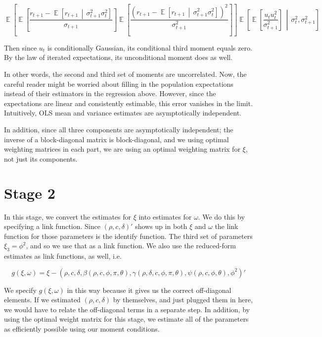 \documentclass[11pt, letterpaper, twoside, final]{article}
\newcommand*{\mvert}{\,\middle\vert\,}
\DeclareMathOperator*{\E}{\mathbb{E}}
\begin{document}
\begin{equation}
    \E\left[\E\left[\frac{r_{t+1} - \E\left[r_{t+1}\mvert \sigma^2_{t+1} \sigma^2_t\right]}{\sigma_{t+1}} \right]
    \E\left[\frac{(r_{t+1} - \E\left[r_{t+1} \mvert \sigma^2_{t+1} \sigma^2_t\right])^2}{\sigma^2_{t+1}}\right]
    \right] 
%
    \E\left[\E\left[\frac{u_t u_t^2}{\sigma^2_{t+1}}\right] \mvert \sigma^2_t, \sigma^2_{t+1} \right] 
\end{equation}

Then since $u_t$ is conditionally Gaussian, its conditional third moment equals zero.  
By the law of iterated expectations, its unconditional moment does as well.

In other words, the second and third set of moments are uncorrelated.
Now, the careful reader might be worried about filling in the population expectations instead of their estimators
in the regression above.
However, since the expectations are linear and consistently estimable, this error vanishes in the limit. 
Intuitively, OLS mean and variance estimates are asymptotically independent.

In addition, since all three components are asymptotically independent; the inverse of a block-diagonal matrix is
block-diagonal, and we using optimal weighting matrices in each part, we are using an
optimal weighting matrix for $\xi$, not just its components.


\section{Stage 2}

In this stage, we convert the estimates for $\xi$ into estimates for $\omega$. 
We do this by specifying a link function.
Since $(\rho, c, \delta)'$ shows up in both $\xi$ and $\omega$ the link function for those parameters is the
identify function.
The third set of parameters $\xi_3 = \phi^2$, and so we use that as a link function.
We also use the reduced-form estimates as link functions, as well, i.e.\@

\begin{equation}
    g(\xi, \omega) = \xi - (\rho, c, \delta, \beta(\rho, c, \phi, \pi, \theta), \gamma(\rho, \delta, c, \phi, \pi,
    \theta), \psi(\rho, c, \phi, \theta), \phi^2)'
\end{equation}

We specify $g(\xi, \omega)$ in this way because it gives us the correct off-diagonal elements.
If we estimated $(\rho, c, \delta)$ by themselves, and just plugged them in here, we would have to relate the
off-diagonal terms in a separate step.
In addition, by using the optimal weight matrix for this stage, we estimate all of the parameters as efficiently
possible using our moment conditions.
\end{document}
